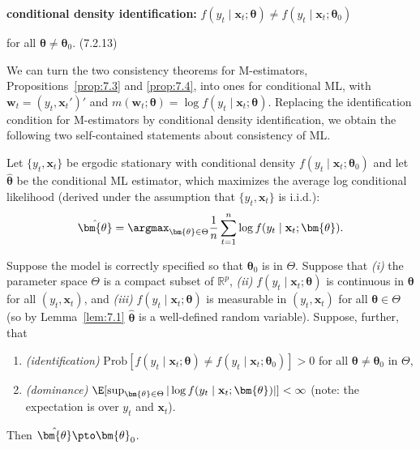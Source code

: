 \begin{defbox}
\textbf{conditional density identification:} $f(y_t \mid \mathbf{x}_t; \bm{\theta}) \neq f(y_t \mid \mathbf{x}_t; \bm{\theta}_0)$

\hfill for all $\bm{\theta} \neq \bm{\theta}_0$. \hfill (7.2.13)
\end{defbox}

We can turn the two consistency theorems for M-estimators, Propositions~\ref{prop:7.3} and \ref{prop:7.4}, into ones for conditional ML, with $\mathbf{w}_t = (y_t, \mathbf{x}_t')'$ and $m(\mathbf{w}_t; \bm{\theta}) = \log f(y_t \mid \mathbf{x}_t; \bm{\theta})$. Replacing the identification condition for M-estimators by conditional density identification, we obtain the following two self-contained statements about consistency of ML.

\begin{proposition}
\label{prop:7.5}
Let $\{y_t, \mathbf{x}_t\}$ be ergodic stationary with conditional density $f(y_t \mid \mathbf{x}_t; \bm{\theta}_0)$ and let $\hat{\bm{\theta}}$ be the conditional ML estimator, which maximizes the average log conditional likelihood (derived under the assumption that $\{y_t, \mathbf{x}_t\}$ is i.i.d.):
\[
\hat{\bm{\theta}} = \argmax_{\bm{\theta} \in \Theta} \frac{1}{n} \sum_{t=1}^{n} \log f(y_t \mid \mathbf{x}_t; \bm{\theta}).
\]

Suppose the model is correctly specified so that $\bm{\theta}_0$ is in $\Theta$. Suppose that \emph{(i)} the parameter space $\Theta$ is a compact subset of $\mathbb{R}^p$, \emph{(ii)} $f(y_t \mid \mathbf{x}_t; \bm{\theta})$ is continuous in $\bm{\theta}$ for all $(y_t, \mathbf{x}_t)$, and \emph{(iii)} $f(y_t \mid \mathbf{x}_t; \bm{\theta})$ is measurable in $(y_t, \mathbf{x}_t)$ for all $\bm{\theta} \in \Theta$ (so by Lemma~\ref{lem:7.1} $\hat{\bm{\theta}}$ is a well-defined random variable). Suppose, further, that
\begin{enumerate}[label=(\alph*)]
\item \emph{(identification)} \enspace $\text{Prob}[f(y_t \mid \mathbf{x}_t; \bm{\theta}) \neq f(y_t \mid \mathbf{x}_t; \bm{\theta}_0)] > 0$ for all $\bm{\theta} \neq \bm{\theta}_0$ in $\Theta$,
\item \emph{(dominance)} \enspace $\E[\sup_{\bm{\theta} \in \Theta} |\log f(y_t \mid \mathbf{x}_t; \bm{\theta})|] < \infty$ (note: the expectation is over $y_t$ and $\mathbf{x}_t$).
\end{enumerate}
Then $\hat{\bm{\theta}} \pto \bm{\theta}_0$.
\end{proposition}

